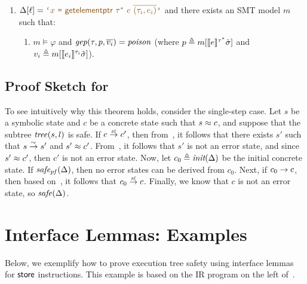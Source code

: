 \begin{definition}
\begin{enumerate}[left=0pt]
    \item $\instrat{\location} = \textup{$\codequote{x \ \texttt{=} \ \tgep~\pointertypeof{\tau} \ e \ \overline{(\tau_i, e_i)}}$}$ and there exists an SMT model $m$ such that:
    \begin{enumerate}
        \item $m \models \varphi$ and $\mathit{gep}(\tau, p, \overline{v_i}) = \mathit{poison}$ (where $p \triangleq m[\llbracket e \rrbracket^{\mathit{\tau^{*}}}{\tilde\sigma}]$ and $v_i \triangleq m[\llbracket e_i \rrbracket^{\tau_i}{\tilde\sigma}]$).
    \end{enumerate}
\end{enumerate}
\end{definition}

\subsection{Proof Sketch for }
\label{appendix:proof-sketch}

To see intuitively why this theorem holds, consider the single-step case.
Let $s$ be a symbolic state and $c$ be a concrete state such that $s \approx c$,
and suppose that the subtree $\mathit{tree}(s, l)$ is safe.
If $c \nsstep c'$, then from~,
it follows that there exists $s'$ such that $s \symstep s'$ and $s' \approx c'$.
From~, it follows that $s'$ is not an error state,
and since $s' \approx c'$, then $c'$ is not an error state.
Now, let $c_0 \triangleq \textit{init}(\Delta)$ be the initial concrete state.
If $\mathit{safe_{pf}}(\Delta)$, then no error states can be derived from $c_0$.
Next, if $c_0 \rightarrow c$,
then based on~, it follows that $c_0 \nsstep c$.
Finally, we know that $c$ is not an error state, so $\mathit{safe}(\Delta)$.

\section{Interface Lemmas: Examples}
\label{appendix:proof-generation}

Below, we exemplify how to prove execution tree safety using interface lemmas for $\textsf{store}$ instructions.
This example is based on the \llvm IR program on the left of~.

